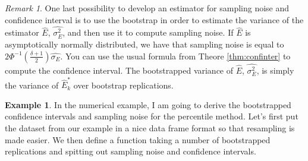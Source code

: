\documentclass[
]{book}
\theoremstyle{definition}
\theoremstyle{definition}
\newtheorem{example}{Example}[chapter]
\theoremstyle{definition}
\theoremstyle{definition}
\theoremstyle{remark}
\newtheorem*{remark}{Remark}
\begin{document}
\begin{remark}
\iffalse{} {Remark. } \fi{}One last possibility to develop an estimator for sampling noise and confidence interval is to use the bootstrap in order to estimate the variance of the estimator \(\hat{E}\), \(\hat{\sigma^2_{E}}\), and then use it to compute sampling noise.
If \(\hat{E}\) is asymptotically normally distributed, we have that sampling noise is equal to \(2\Phi^{-1}\left(\frac{\delta+1}{2}\right)\hat{\sigma_{E}}\).
You can use the usual formula from Theore \ref{thm:confinter} to compute the confidence interval.
The bootstrapped variance of \(\hat{E}\), \(\hat{\sigma^2_{E}}\), is simply the variance of \(\hat{E}^*_k\) over bootstrap replications.
\end{remark}

\begin{example}
\protect\hypertarget{exm:unnamed-chunk-59}{}{\label{exm:unnamed-chunk-59} }In the numerical example, I am going to derive the bootstrapped confidence intervals and sampling noise for the percentile method.
Let's first put the dataset from our example in a nice data frame format so that resampling is made easier.
We then define a function taking a number of bootstrapped replications and spitting out sampling noise and confidence intervals.
\end{example}
\end{document}
